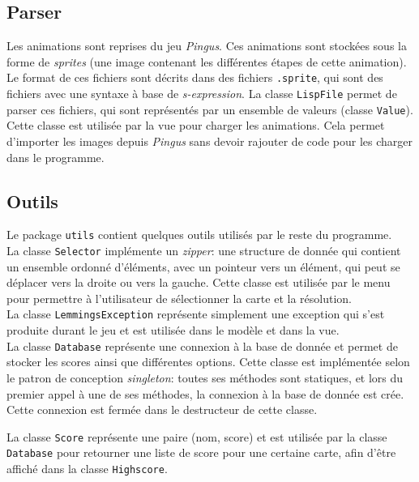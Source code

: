 \documentclass[a4paper,12pt]{article}
\begin{document}
\subsection{Parser}

Les animations sont reprises du jeu \emph{Pingus}. Ces
animations sont stockées sous la forme de \emph{sprites}
(une image contenant les différentes étapes de cette
animation). Le format de ces fichiers sont décrits dans des
fichiers \texttt{.sprite}, qui sont des fichiers avec une
syntaxe à base de \emph{s-expression}. La classe
\texttt{LispFile} permet de parser ces fichiers, qui sont
représentés par un ensemble de valeurs (classe
\texttt{Value}). Cette classe est utilisée par la vue pour
charger les animations. Cela permet d'importer les images
depuis \emph{Pingus} sans devoir rajouter de code pour les
charger dans le programme.

\subsection{Outils}
Le package \texttt{utils} contient quelques outils utilisés
par le reste du programme.\\

La classe \texttt{Selector} implémente un \emph{zipper}: une
structure de donnée qui contient un ensemble ordonné
d'éléments, avec un pointeur vers un élément, qui peut
se déplacer vers la droite ou vers la gauche. Cette classe
est utilisée par le menu pour permettre à l'utilisateur de
sélectionner la carte et la résolution.\\

La classe \texttt{LemmingsException} représente simplement
une exception qui s'est produite durant le jeu et est
utilisée dans le modèle et dans la vue.\\

La classe \texttt{Database} représente une connexion à la
base de donnée et permet de stocker les scores ainsi que
différentes options. Cette classe est implémentée selon le
patron de conception \emph{singleton}: toutes ses méthodes
sont statiques, et lors du premier appel à une de ses
méthodes, la connexion à la base de donnée est crée. Cette
connexion est fermée dans le destructeur de cette classe.

La classe \texttt{Score} représente une paire (nom, score)
et est utilisée par la classe \texttt{Database} pour
retourner une liste de score pour une certaine carte, afin
d'être affiché dans la classe \texttt{Highscore}.
\end{document}
